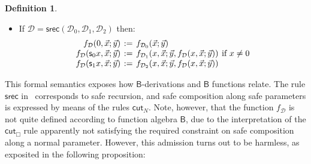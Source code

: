 \documentclass[manuscript,screen]{acmart}
\newcommand{\dfn}{:=}
\theoremstyle{definition}
\newtheorem{defn}[thm]{Definition}
\theoremstyle{remark}
\newcommand{\n}{N}
\newcommand{\sq}{\Box}
\renewcommand{\succ}[1]{\mathsf{s}_{#1}}
\newcommand{\denot}[1]{f_{#1}}
\newcommand{\saferec}{\mathsf{srec}}
\newcommand{\srec}{\saferec}
\newcommand{\bc}{\mathsf{B}}
\newcommand{\der}{\mathcal{D}}
\newcommand{\cut}{\mathsf{cut}}
\begin{document}
\begin{defn}
\begin{itemize}
\[\begin{array}{rcll}
         \denot \der (\succ 0 x, \vec x; \vec y) & \dfn & \denot{\der_1} (x, \vec x; \vec y) & \text{if $x \neq 0$} \\
         \denot \der (\succ 1 x , \vec x; \vec y) & \dfn & \denot{\der_2} (x, \vec x; \vec y) 
    \end{array}
    \]
    \item If $\der =\srec(\der_0, \der_1, \der_2)$ then:
    \[
     \arraycolsep=2pt
    \begin{array}{rcll}
         \denot \der (0, \vec x;\vec y) & \dfn &  \denot{\der_0} (\vec x;\vec y) \\
         \denot \der (\succ 0 x, \vec x; \vec y) & \dfn & \denot{\der_1} (x, \vec x; \vec y, \denot\der(x, \vec x; \vec y)) & \text{if $x \neq 0$} \\
         \denot \der (\succ 1 x , \vec x; \vec y) & \dfn & \denot{\der_2} (x, \vec x; \vec y,  \denot\der(x, \vec x; \vec y)) 
    \end{array}
    \]
\end{itemize}
\end{defn}




This formal semantics exposes how $\bc$-derivations and $\bc$ functions relate. The rule $\saferec$ in~ corresponds to safe recursion, and safe composition along safe parameters is expressed by means of the rules $\cut_\n$. 
Note, however, that the function $f_\der$ is not quite defined according to function algebra $\bc$, due to the  interpretation of the $\cut_\sq$ rule apparently not satisfying the required constraint on safe composition along a normal parameter.
However, this admission turns out to
be harmless, as exposited in the following proposition:
\end{document}
